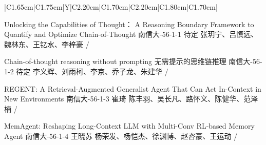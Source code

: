 \Needspace{7.5cm}
\begin{tabularx}{\textwidth}{|C{1.65cm}|C{1.75cm}|Y|C{2.20cm}|C{1.70cm}|C{2.20cm}|C{1.80cm}|C{1.70cm}|}
\HeaderRow

{Unlocking the Capabilities of Thought： A Reasoning Boundary Framework to Quantify and Optimize Chain-of-Thought\newline }
{南信大-56-1-1}
{待定}
{张玥宁、吕慎远、魏林东、王钇水、李梓豪}
{}{/}

{Chain-of-thought reasoning without prompting \newline 无需提示的思维链推理}
{南信大-56-1-2}
{待定}
{李义辉、刘雨柯、李京、乔子龙、朱建华}
{}{/}


{REGENT: A Retrieval-Augmented Generalist Agent That Can Act In-Context in New Environments \newline }
{南信大-56-1-3}
{崔琦}
{陈丰羽、吴长凡、路怀义、陈健华、范泽楠}
{}{/}

{MemAgent: Reshaping Long-Context LLM with Multi-Conv RL-based Memory Agent \newline }
{南信大-56-1-4}
{王晓苏}
{杨荣发、杨恺杰、徐渊博、赵咨豪、王运动}
{}{/}
\end{tabularx}
\BlockGap



